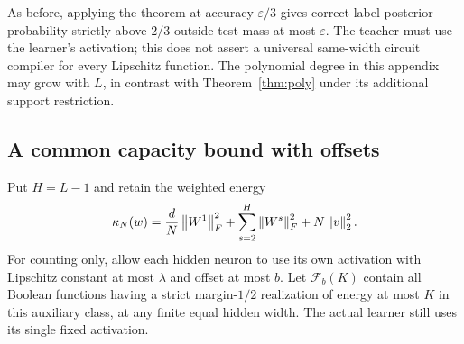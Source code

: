 As before, applying the theorem at accuracy $\varepsilon/3$ gives
correct-label posterior probability strictly above $2/3$ outside test
mass at most $\varepsilon$. The teacher must use the learner's activation;
this does not assert a universal same-width circuit compiler for every
Lipschitz function. The polynomial degree in this appendix may grow with
$L$, in contrast with Theorem~\ref{thm:poly} under its additional support
restriction.

\subsection{A common capacity bound with offsets}
Put $H=L-1$ and retain the weighted energy
\[
 \kappa_N(w)=\frac dN\left\lVert W^1\right\rVert_F^2+
 \sum_{s=2}^{H}\left\lVert W^s\right\rVert_F^2+N\left\lVert v\right\rVert_2^2.
\]
For counting only, allow each hidden neuron to use its own activation
with Lipschitz constant at most $\lambda$ and offset at most $b$.
Let $\mathcal F_b(K)$ contain all Boolean functions having a strict
margin-$1/2$ realization of energy at most $K$ in this auxiliary class,
at any finite equal hidden width. The actual learner still uses its
single fixed activation.

